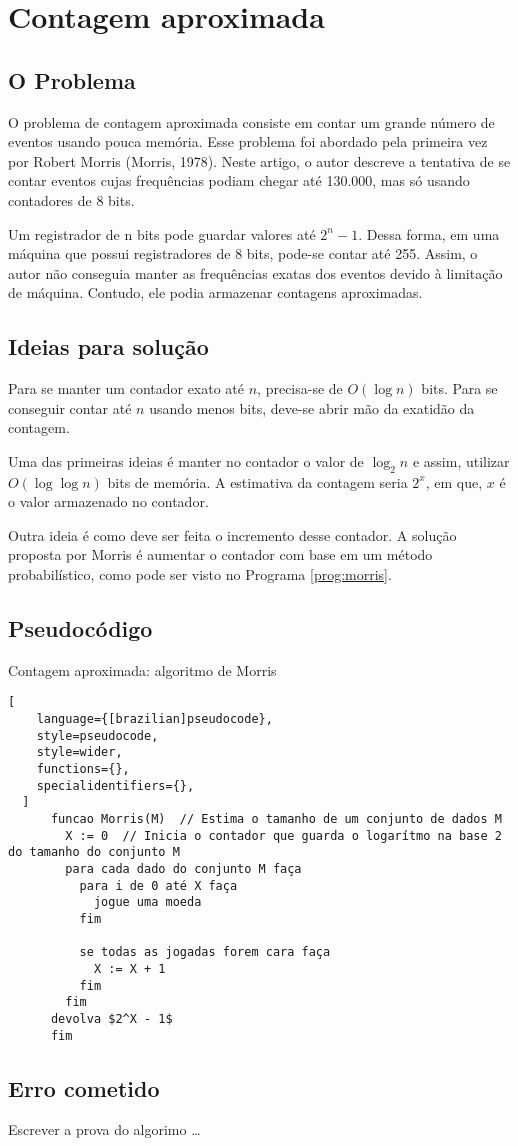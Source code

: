 \chapter{Contagem aproximada}
\label{chap:morris}


\section{O Problema}

O problema de contagem aproximada consiste em contar um grande número de eventos usando pouca memória.  
Esse problema foi abordado pela primeira vez por Robert  Morris (Morris, 1978). 
Neste artigo, o autor descreve a tentativa de se contar eventos cujas frequências podiam chegar até 130.000, mas só usando contadores de 8 bits.

Um registrador de n bits pode guardar valores até $2^n-1$. Dessa forma, em uma máquina que possui registradores de 8 bits, pode-se contar até 255.
Assim, o autor não conseguia manter as frequências exatas dos eventos devido à limitação de máquina. 
Contudo, ele podia armazenar contagens aproximadas.


\section{Ideias para solução}

Para se manter um contador exato até $n$, precisa-se de $O(\log n)$ bits. Para se conseguir contar até $n$ usando menos bits, 
deve-se abrir mão da exatidão da contagem. 

Uma das primeiras ideias é manter no contador o valor de $\log_2 n$ e assim, utilizar $O(\log \log n)$ bits de memória. 
A estimativa da contagem seria $2^x$, em que, $x$ é o valor armazenado no contador.

Outra ideia é como deve ser feita o incremento desse contador. 
A solução proposta por Morris é aumentar o contador com base em um método probabilístico, como pode ser visto no Programa \ref{prog:morris}. 


\section{Pseudocódigo}

\begin{programruledcaption}{Contagem aproximada: algoritmo de Morris\label{prog:morris}}
  \begin{lstlisting}[
    language={[brazilian]pseudocode},
    style=pseudocode,
    style=wider,
    functions={},
    specialidentifiers={},
  ]
      funcao Morris(M)  // Estima o tamanho de um conjunto de dados M
        X := 0  // Inicia o contador que guarda o logarítmo na base 2 do tamanho do conjunto M
        para cada dado do conjunto M faça
          para i de 0 até X faça
            jogue uma moeda 
          fim

          se todas as jogadas forem cara faça
            X := X + 1
          fim
        fim
      devolva $2^X - 1$
      fim
  \end{lstlisting}
\end{programruledcaption}

\section{Erro cometido}

Escrever a prova do algorimo \dots
